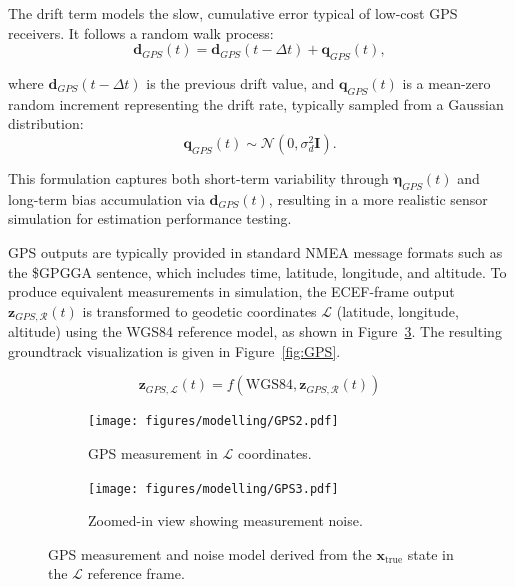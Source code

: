 \noindent The drift term models the slow, cumulative error typical of low-cost GPS receivers. It follows a random walk process:
\begin{equation}
    \mathbf{d}_{GPS}(t) = \mathbf{d}_{GPS}(t - \Delta t) + \mathbf{q}_{GPS}(t),
\end{equation}

\noindent where $\mathbf{d}_{GPS}(t - \Delta t)$ is the previous drift value, and $\mathbf{q}_{GPS}(t)$ is a mean-zero random increment representing the drift rate, typically sampled from a Gaussian distribution:
\begin{equation}
    \mathbf{q}_{GPS}(t) \sim \mathcal{N}(0, \sigma_d^2 \mathbf{I}).
\end{equation}

\noindent This formulation captures both short-term variability through $\boldsymbol{\eta}_{GPS}(t)$ and long-term bias accumulation via $\mathbf{d}_{GPS}(t)$, resulting in a more realistic sensor simulation for estimation performance testing.
\vspace{0.5cm}

\noindent GPS outputs are typically provided in standard NMEA message formats such as the \$GPGGA sentence, which includes time, latitude, longitude, and altitude. To produce equivalent measurements in simulation, the ECEF-frame output $\mathbf{z}_{GPS,\mathcal{R}}(t)$ is transformed to geodetic coordinates $\mathcal{L}$ (latitude, longitude, altitude) using the WGS84 reference model, as shown in Figure~\ref{fig:gps}. The resulting groundtrack visualization is given in Figure~\ref{fig:GPS}.

\begin{equation}
    \mathbf{z}_{GPS,\mathcal{L}}(t) = f(\text{WGS84}, \mathbf{z}_{GPS,\mathcal{R}}(t))
\end{equation}

\begin{figure}[H]
    \centering
    \begin{subfigure}{0.45\textwidth}
        \centering
        \texttt{[image: figures/modelling/GPS2.pdf]}
        \caption{GPS measurement in $\mathcal{L}$ coordinates.}
        \label{fig:gps-a}
    \end{subfigure}
    \hfill
    \begin{subfigure}{0.45\textwidth}
        \centering
        \texttt{[image: figures/modelling/GPS3.pdf]}
        \caption{Zoomed-in view showing measurement noise.}
        \label{fig:gps-b}
    \end{subfigure}
    \caption{GPS measurement and noise model derived from the $\mathbf{x}_{\text{true}}$ state in the $\mathcal{L}$ reference frame.}
    \label{fig:gps}
\end{figure}

